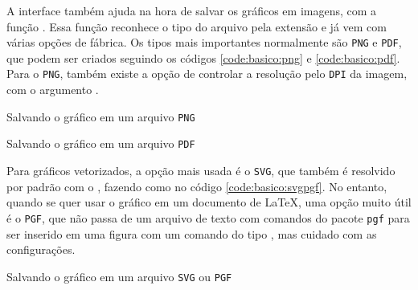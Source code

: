 A interface \pyplot também ajuda na hora de salvar os gráficos em imagens, com a função . Essa função reconhece o tipo do arquivo pela extensão e já vem com várias opções de fábrica. Os tipos mais importantes normalmente são \texttt{PNG} e \texttt{PDF}, que podem ser criados seguindo os códigos \ref{code:basico:png} e  \ref{code:basico:pdf}. Para o \texttt{PNG}, também existe a opção de controlar a resolução pelo \texttt{DPI} da imagem, com o argumento .

\begin{listing}[H]
    \caption{Salvando o gráfico em um arquivo \texttt{PNG}}
    \label{code:basico:png}

\end{listing}

\begin{listing}[H]
    \caption{Salvando o gráfico em um arquivo \texttt{PDF}}
    \label{code:basico:pdf}

\end{listing}

Para gráficos vetorizados, a opção mais usada é o \texttt{SVG}, que também é resolvido por padrão com o \matplotlib, fazendo como no código \ref{code:basico:svgpgf}. No entanto, quando se quer usar o gráfico em um documento de \LaTeX, uma opção muito útil é o \texttt{PGF}, que não passa de um arquivo de texto com comandos do pacote \texttt{pgf} para ser inserido em uma figura com um comando do tipo \texttt{}, mas cuidado com as configurações.

\begin{listing}[H]
    \caption{Salvando o gráfico em um arquivo \texttt{SVG} ou \texttt{PGF}}
    \label{code:basico:svgpgf}

\end{listing}
